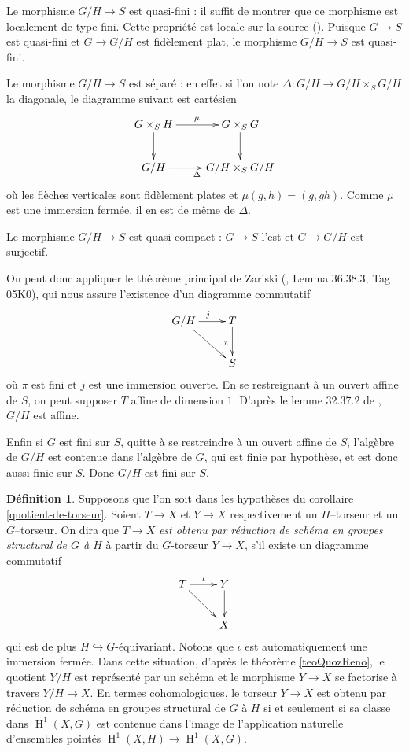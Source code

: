 \documentclass[11pt]{amsart}
\numberwithin{equation}{section}
\theoremstyle{definition}
\newtheorem{defi}[thm]{D\'efinition}
\theoremstyle{remark}
\DeclareMathOperator{\h}{H}
\begin{document}
Le morphisme $G/H \to S$ est quasi-fini : il suffit de montrer que ce morphisme est localement de type fini. Cette propri\'et\'e est locale sur la source (\cite[Lemma 34.25.2, Tag 036O]{ST}). Puisque  $G\to S$ est quasi-fini et $G \to G/H$ est fid\`element plat, le morphisme $G/H \to S$ est quasi-fini.


Le morphisme $G/H \to S$ est  s\'epar\'e : en effet si l'on note $\Delta : G/H \to G/H \times _S G/H$ la diagonale, le diagramme suivant est cart\'esien
$$\xymatrix{
G \times _S H \ar[r]^\mu \ar[d] & G\times _S G \ar[d]\\
G/H \ar[r]_\Delta & G/H \times _S G/H \\
}$$ o\`u les fl\`eches verticales sont fid\`element plates et $\mu (g,h)=(g,gh)$. Comme $\mu$ est une immersion ferm\'ee, il en est de m\^eme de $\Delta$.

Le morphisme $G/H \to S$ est quasi-compact : $G \to S$ l'est et $G \to G/H$ est surjectif.

On peut donc appliquer le th\'eor\`eme principal de Zariski (\cite{ST}, Lemma 36.38.3, Tag 05K0), qui nous assure l'existence d'un diagramme commutatif
$$\xymatrix{
G/H \ar[rd] \ar[r]^j& T \ar[d]_\pi \\
&S\\
}$$ o\`u $\pi $ est fini et $j$ est une immersion ouverte. En se restreignant \`a un ouvert affine de $S$, on peut supposer $T$ affine de dimension $1$. D'apr\`es le lemme 32.37.2 de \cite[Tag 09N9]{ST}, $G/H$ est affine.

Enfin si $G$ est fini sur $S$, quitte \`a se restreindre \`a un ouvert affine de $S$, l'alg\`ebre de $G/H$ est contenue dans l'alg\`ebre de $G$, qui est finie par hypoth\`ese, et est donc aussi finie sur $S$. Donc $G/H$ est fini sur $S$.
\endproof

\begin{defi}
Supposons que l'on soit dans les hypoth\`eses du corollaire \ref{quotient-de-torseur}.  Soient $T\to X$ et $Y\to X$ respectivement un $H$--torseur et un $G$--torseur. On dira que $T\to X$ {\it est obtenu par r\'eduction de sch\'ema en groupes structural de $G$ \`a $H$} \`a partir du $G$-torseur $Y\to X$, s'il existe un diagramme commutatif 
$$\xymatrix{
T \ar[rd] \ar[r]^\iota& Y \ar[d] \\
&X\\
}$$
qui est de plus $H \hookrightarrow G$-\'equivariant. Notons que $\iota$ est automatiquement une immersion ferm\'ee. Dans cette situation, d'apr\`es le th\'eor\`eme \ref{teoQuozReno}, le quotient $Y/H$ est repr\'esent\'e par un sch\'ema et le morphisme $Y \to X$ se factorise \`a travers $Y/H \to X$. En termes cohomologiques, le torseur $Y\to X$ est obtenu par r\'eduction de sch\'ema en groupes structural de $G$ \`a $H$ si et seulement si sa classe dans $\h ^1(X,G)$ est contenue dans l'image de l'application naturelle d'ensembles point\'es $\h ^1(X,H)\to \h ^1(X,G)$.\end{defi}
\end{document}
